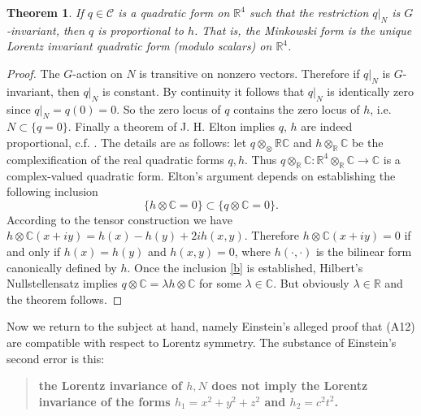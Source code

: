 \documentclass[12pt]{amsart}
\newtheorem{thm}{Theorem}
\theoremstyle{definition}
\theoremstyle{remark}
\newcommand{\bC}{\mathbb{C}}
\newcommand{\bR}{\mathbb{R}}
\newcommand{\sC}{\mathscr{C}}
\begin{document}
\begin{thm}
If $q\in \sC$ is a quadratic form on $\bR^4$ such that the restriction $q|_N$ is $G$-invariant, then $q$ is proportional to $h$. That is, the Minkowski form is the unique Lorentz invariant quadratic form (modulo scalars) on $\bR^4$.
\end{thm} 
\begin{proof}
The $G$-action on $N$ is transitive on nonzero vectors. Therefore if $q|_N$ is $G$-invariant, then $q|_N$ is constant. By continuity it follows that $q|_N$ is identically zero since $q|_N=q(0)=0$. So the zero locus of $q$ contains the zero locus of $h$, i.e. $N\subset \{q=0\}$. Finally a theorem of J. H. Elton implies $q$, $h$ are indeed proportional, c.f. \cite{elton2010indefinite}. The details are as follows: let $q\otimes_\otimes \bR \bC$ and $h\otimes_\bR \bC$ be the complexification of the real quadratic forms $q,h$. Thus $q\otimes_\bR \bC: \bR^4 \otimes_\bR \bC \to \bC$ is a complex-valued quadratic form. Elton's argument depends on establishing the following inclusion \begin{equation}\label{b}
\{h\otimes \bC=0\} \subset \{q\otimes \bC=0\}.
\end{equation}
According to the tensor construction we have $h\otimes \bC (x+iy)=h(x)-h(y) + 2i h(x,y)$. Therefore $h\otimes \bC(x+iy)=0$ if and only if $h(x)=h(y)$ and $h(x,y)=0$, where $h(\cdot, \cdot)$ is the bilinear form canonically defined by $h$. Once the inclusion \eqref{b} is established, Hilbert's Nullstellensatz \cite{eisenbud2013commutative} implies $q\otimes \bC=\lambda h\otimes \bC$ for some $\lambda \in \bC$. But obviously $\lambda\in \bR$ and the theorem follows.
\end{proof}


Now we return to the subject at hand, namely Einstein's alleged proof that (A12) are compatible with respect to Lorentz symmetry. The substance of Einstein's second error is this: \begin{quote} \textbf{the Lorentz invariance of $h, N$ does not imply the Lorentz invariance of the forms $h_1=x^2+y^2+z^2$ and $h_2=c^2 t^2$.} \end{quote}
\end{document}
